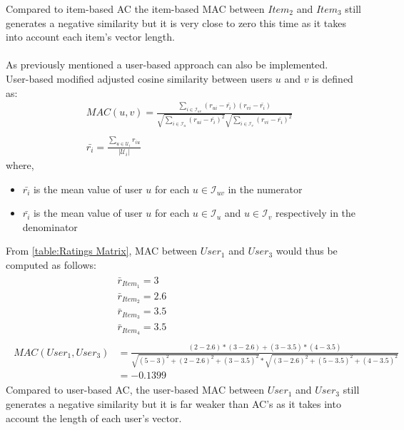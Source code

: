 \normalsize
Compared to item-based AC the item-based MAC between $Item_2$ and $Item_3$ still generates
a negative similarity but it is very close to zero this time as it takes into account each
item's vector length.\\\\
As previously mentioned a user-based approach can also be implemented.\\
User-based modified adjusted cosine similarity between users $u$ and $v$ is defined as:
\begin{equation}\label{eq:modified_adjusted_cosine}
\begin{split}
    &MAC(u,v) = \frac{\sum_{i \in \mathcal{I}_{uv}}(r_{ui}-\bar{r_{i}})(r_{vi}-\bar{r_{i}})}
                     {\sqrt{\sum_{i \in \mathcal{I}_{u}}(r_{ui}-\bar{r_{i}})^2}
                      \sqrt{\sum_{i \in \mathcal{I}_{v}}(r_{vi}-\bar{r_{i}})^2}} \\\\
    &\bar{r_{i}} = \frac{\sum_{u \in \mathcal{U}_i}r_{iu}}
                        {\mathopen|\mathcal{U}_i\mathclose|}
\end{split}
\end{equation}
where,
\begin{itemize}
	\item[] $\bar{r_i}$ is the mean value of user $u$ for each $u \in \mathcal{I}_{uv}$ in the numerator
	\item[] $\bar{r_i}$ is the mean value of user $u$ for each $u \in \mathcal{I}_{u}$ and $u \in \mathcal{I}_{v}$ respectively in the denominator
\end{itemize}
From \autoref{table:Ratings Matrix}, MAC
between $User_1$ and $User_3$ would thus be computed as follows:
\begin{align*}
	\begin{split}
		&\bar{r}_{Item_1} = 3\\
		&\bar{r}_{Item_2}  = 2.6\\
		&\bar{r}_{Item_3} = 3.5\\
		&\bar{r}_{Item_4} = 3.5\\\\
MAC(User_1,User_3) &= \frac{(2 - 2.6)*(3 - 2.6) + (3 - 3.5)*(4 - 3.5)}
						 {\sqrt{(5 - 3)^2 + (2 - 2.6)^2 + (3 - 3.5)^2}*
						  \sqrt{(3 - 2.6)^2 + (5 - 3.5)^2 + (4 - 3.5)^2}} \\&= −0.1399
  \end{split}
\end{align*}
Compared to user-based AC, the user-based MAC between $User_1$ and $User_3$ still generates
a negative similarity but it is far weaker than AC's as it takes into account the length of
each user's vector.
